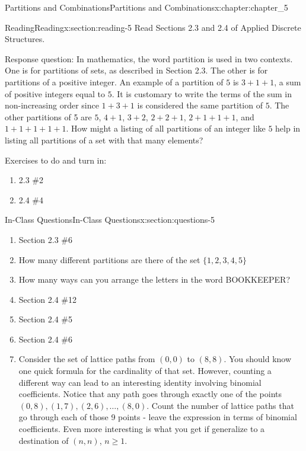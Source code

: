 \documentclass[oneside,10pt,]{book}
\numberwithin{equation}{section}
\begin{document}
%
%
\typeout{************************************************}
\typeout{************************************************}
%
\begin{chapterptx}{Partitions and Combinations}{}{Partitions and Combinations}{}{}{x:chapter:chapter_5}
\index{}%
%
%
\typeout{************************************************}
\typeout{************************************************}
%
\begin{sectionptx}{Reading}{}{Reading}{}{}{x:section:reading-5}
Read Sections 2.3 and 2.4 of Applied Discrete Structures.%
\par
Response question: In mathematics, the word partition is used in two contexts. One is for partitions of sets, as described in Section 2.3. The other is for partitions of a positive integer.  An example of a partition of \(5\) is \(3+1+1\), a sum of positive integers equal to \(5\). It is customary to write the terms of the sum in non-increasing order since \(1+3+1\) is considered the same partition of \(5\). The other partitions of 5 are \(5\), \(4+1\), \(3+2\), \(2+2+1\), \(2+1+1+1\), and \(1+1+1+1+1\). How might a listing of all partitions of an integer like \(5\) help in listing all partitions of a set with that many elements?%
\par
Exercises to do and turn in:%
\begin{enumerate}
\item{}2.3 \#2%
\item{}2.4  \#4%
\end{enumerate}
%
\end{sectionptx}
%
%
\typeout{************************************************}
\typeout{************************************************}
%
\begin{sectionptx}{In-Class Questions}{}{In-Class Questions}{}{}{x:section:questions-5}
%
\begin{enumerate}[label=\arabic*.]
\item{}Section 2.3 \#6%
\item{}How many different partitions are there of the set \(\{1,2,3,4,5\}\)%
\item{}How many ways can you arrange the letters in the word BOOKKEEPER?%
\item{}Section 2.4 \#12%
\item{}Section 2.4 \#5%
\item{}Section 2.4 \#6%
\item{}Consider the set of lattice paths from \((0,0)\) to \((8,8)\).  You should know one quick formula for the cardinality of that set.  However, counting a different way can lead to an interesting  identity involving binomial coefficients.  Notice that any path goes through exactly one of the points \((0,8), (1,7), (2,6), \dots , (8,0)\).  Count the number of lattice paths that go through each of those 9 points - leave the expression in terms of binomial coefficients.  Even more interesting is what you get if  generalize to a destination of \((n,n)\), \(n \geq 1\).%

\end{enumerate}
\end{sectionptx}
\end{chapterptx}
\end{document}
